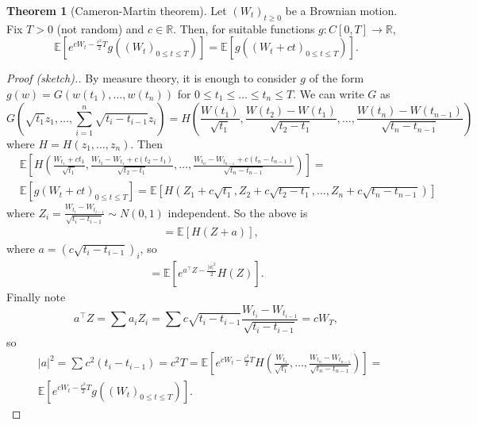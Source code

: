 \documentclass{article}
\theoremstyle{definition}
\newtheorem{theorem}{Theorem}[section]
\begin{document}
\begin{theorem}[Cameron-Martin theorem]
    Let $(W_t)_{t\ge 0}$ be a Brownian motion. Fix $T>0$ (not random) and $c \in \mathbb{R}$. Then, for suitable functions $g : C[0,T] \to \mathbb{R}$,
    \[
    \mathbb{E}[e^{cW_t - \frac{c^2}{2}T}g((W_t)_{0\le t\le T})] = \mathbb{E}[g((W_t+ct)_{0\le t\le T})].
    \]
\end{theorem}
\begin{proof}[Proof (sketch).]
    By measure theory, it is enough to consider $g$ of the form $g(w)=G(w(t_1),\ldots,w(t_n))$ for $0\le t_1 \le \ldots \le t_n \le T$. We can write $G$ as \[
    G(\sqrt{t_1}z_1,\ldots,\sum_{i=1}^{n} \sqrt{t_i-t_{i-1}}z_i) = H\left(\frac{W(t_1)}{\sqrt{t_1}}, \frac{W(t_2)-W(t_1)}{\sqrt{t_2-t_1}},\ldots,\frac{W(t_n)-W(t_{n-1})}{\sqrt{t_n-t_{n-1}}}\right)
    \] where $H=H(z_1,\ldots,z_n)$. Then 
    \begin{align*}
        &\mathbb{E}\left[H\left(\frac{W_{t_1}+ct_1}{\sqrt{t_1}}, \frac{W_{t_2}-W_{t_1}+c(t_2-t_1)}{\sqrt{t_2-t_1}},\ldots,\frac{W_{t_n}-W_{t_{n-1}}+c(t_n-t_{n-1})}{\sqrt{t_n-t_{n-1}}}\right)\right] =\\
        &\mathbb{E}[g(W_t+ct)_{0\le t\le T}] = \mathbb{E}[H(Z_1+c\sqrt{t_1},Z_2+c\sqrt{t_2-t_1},\ldots,Z_n+c\sqrt{t_n-t_{n-1}})]
    \end{align*}
    where $Z_i = \frac{W_{t_i}-W_{t_{i-1}}}{\sqrt{t_i-t_{i-1}}} \sim N(0,1)$ independent. So the above is 
    \begin{align*}
        &= \mathbb{E}[H(Z+a)],
    \end{align*}
    where $a=(c\sqrt{t_i-t_{i-1}})_i$, so 
    \begin{align*}
        =\mathbb{E}[e^{a^\top Z - \frac{|a|^2}{2}}H(Z)].
    \end{align*}
    Finally note \[
    a^\top Z = \sum_{}^{} a_i Z_i = \sum_{}^{} c \sqrt{t_i-t_{i-1}} \frac{W_{t_i}-W_{t_{i-1}}}{\sqrt{t_i-t_{i-1}}} = cW_T,
    \]
    so 
    \begin{align*}
        &|a|^2 = \sum_{}^{} c^2(t_i - t_{i-1}) = c^2 T = \mathbb{E}\left[e^{cW_t-\frac{c^2}{2}T}H\left(\frac{W_{t_1}}{\sqrt{t_1}},\ldots,\frac{W_{t_n}-W_{t_{n-1}}}{\sqrt{t_n-t_{n-1}}}\right)\right] =\\ 
        &\mathbb{E}[e^{cW_t - \frac{c^2}{2}T}g((W_t)_{0\le t\le T})].
    \end{align*}
\end{proof}
\end{document}

